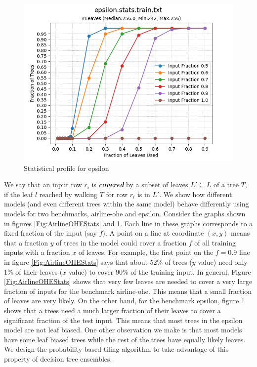 \begin{figure}
    \centering
    \includegraphics[width=\linewidth]{figures/epsilon.stats.train.txt.png}
    \caption{Statistical profile for epsilon}
    \label{Fig:EpsilonStats}
\end{figure}

We say that an input row $r_i$ is \textbf{\emph{covered}} by a subset of leaves $L' \subseteq L$ of a tree $T$, if the leaf $l$ reached by 
walking $T$ for row $r_i$ is in $L'$. We show how different models (and even different trees within the same model) behave differently 
using models for two benchmarks, airline-ohe and epsilon. Consider the graphs shown in   
figures \ref{Fig:AirlineOHEStats} and \ref{Fig:EpsilonStats}. Each line in these graphs corresponds to a fixed fraction of the input (say $f$). 
A point on a line at coordinate $(x, y)$ means that a fraction $y$ of trees in the model could cover a fraction $f$ of all training inputs with a fraction $x$ of 
leaves. For example, the first point on the $f=0.9$ line in figure \ref{Fig:AirlineOHEStats} says that about 52\% of trees ($y$ value) need only 1\% of their
leaves ($x$ value) to cover 90\% of the training input. 
In general, Figure \ref{Fig:AirlineOHEStats} shows that very few leaves are needed to cover a very large fraction of inputs for the benchmark airline-ohe. 
This means that a small fraction of leaves are very likely. On the other hand, for the benchmark epsilon,
figure \ref{Fig:EpsilonStats} shows that a trees need a much larger fraction of their leaves to cover a significant fraction of the test input.
This means that most trees in the epsilon model are not leaf biased.
One other observation we make is that most models have some leaf biased trees while the rest of the trees have equally likely leaves.
 We design the probability based tiling algorithm to take advantage of this property 
of decision tree ensembles. 

